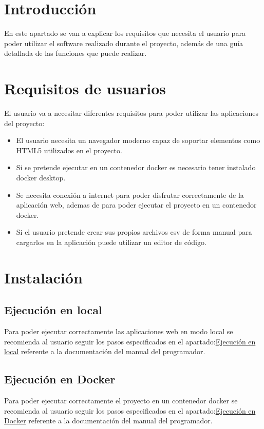 
\section{Introducción}
En este apartado se van a explicar los requisitos que necesita el usuario para poder utilizar el software realizado durante el proyecto, además de una guía detallada de las funciones que puede realizar.

\section{Requisitos de usuarios}
El usuario va a necesitar diferentes requisitos para poder utilizar las aplicaciones del proyecto:

\begin{itemize}
    \item El usuario necesita un navegador moderno capaz de soportar elementos como HTML5 utilizados en el proyecto.
    \item Si se pretende ejecutar en un contenedor docker es necesario tener instalado docker desktop.
    \item Se necesita conexión a internet  para poder disfrutar correctamente de la aplicación web, ademas de para poder ejecutar el proyecto en un contenedor docker. 
    \item Si el usuario pretende crear sus propios archivos csv de forma manual para cargarlos en la aplicación puede utilizar un editor de código.
\end{itemize}



\section{Instalación}

\subsection{Ejecución en local}
Para poder ejecutar correctamente las aplicaciones web en modo local se recomienda al usuario seguir los pasos especificados en el apartado:\hyperref[ejec_local]{Ejecución en local} referente a la documentación del manual del programador.

\subsection{Ejecución en Docker}
Para poder ejecutar correctamente el proyecto en un contenedor docker se recomienda al usuario seguir los pasos especificados en el apartado:\hyperref[ejec_docker]{Ejecución en Docker} referente a la documentación del manual del programador.

